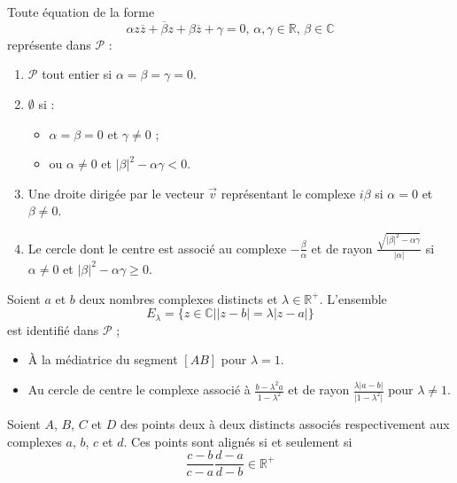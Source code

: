   \begin{theorem}
    Toute équation de la forme
    \[ \alpha z \overline{z} + \overline{\beta} z + \beta \overline{z} + \gamma = 0, \, \alpha, \gamma \in \mathbb{R}, \, \beta \in \mathbb{C} \]
    représente dans $\mathcal{P}$ :
    \begin{enumerate}[label={\bfseries(\roman*)}]
      \item $\mathcal{P}$ tout entier si $\alpha = \beta = \gamma = 0$.
      \item $\emptyset$ si :
      \begin{itemize}
        \item $\alpha = \beta = 0$ et $\gamma \neq 0$ ;
        \item ou $\alpha \neq 0$ et $\vert \beta \vert^2 - \alpha \gamma < 0$.
      \end{itemize}
      \item Une droite dirigée par le vecteur $\overrightarrow{v}$ représentant le complexe $i\beta$ si $\alpha = 0$ et $\beta \neq 0$.
      \item Le cercle dont le centre est associé au complexe $-\frac{\beta}{\alpha}$ et de rayon $\frac{\sqrt{\vert \beta \vert^2 - \alpha \gamma}}{\vert \alpha \vert}$ si $\alpha \neq 0$ et $\vert \beta \vert^2 - \alpha \gamma \geq 0$.
    \end{enumerate}
  \end{theorem}

  \begin{corollary}
    Soient $a$ et $b$ deux nombres complexes distincts et $\lambda \in \mathbb{R}^+$. L'ensemble
    \[ E_\lambda = \{ z \in \mathbb{C} \mid \vert z - b \vert = \lambda \vert z - a \vert \} \]
    est identifié dans $\mathcal{P}$ ;
    \begin{itemize}
      \item À la médiatrice du segment $[AB]$ pour $\lambda = 1$.
      \item Au cercle de centre le complexe associé à $\frac{b-\lambda^2 a}{1 - \lambda^2}$ et de rayon $\frac{\lambda \vert a - b \vert}{\vert 1 - \lambda^2 \vert}$ pour $\lambda \neq 1$.
    \end{itemize}
  \end{corollary}

  \begin{theorem}
    Soient $A$, $B$, $C$ et $D$ des points deux à deux distincts associés respectivement aux complexes $a$, $b$, $c$ et $d$. Ces points sont alignés si et seulement si
    \[ \frac{c-b}{c-a} \frac{d-a}{d-b} \in \mathbb{R}^+ \]
  \end{theorem}

